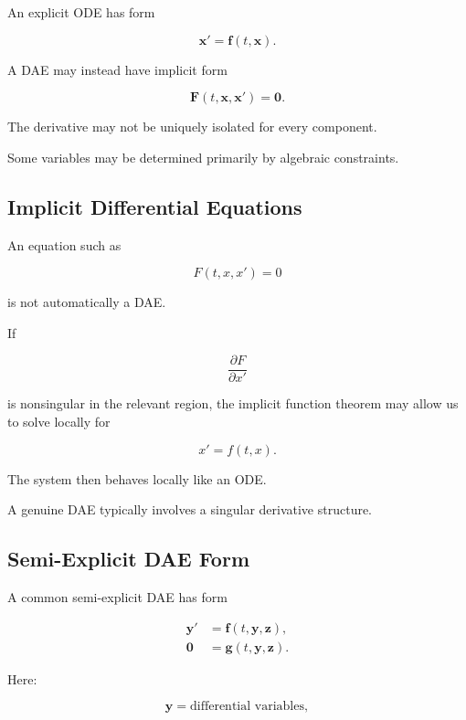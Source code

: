 An explicit ODE has form

\[
\boxed{
\mathbf{x}'
=
\mathbf{f}(t,\mathbf{x}).
}
\]

A DAE may instead have implicit form

\[
\boxed{
\mathbf{F}
(
t,
\mathbf{x},
\mathbf{x}'
)
=
\mathbf{0}.
}
\]

The derivative may not be uniquely isolated for every component.

Some variables may be determined primarily by algebraic constraints.

\subsection{Implicit Differential Equations}
\label{subsec:implicit-differential-equations}

An equation such as

\[
\boxed{
F(t,x,x')=0
}
\]

is not automatically a DAE.

If

\[
\frac{\partial F}{\partial x'}
\]

is nonsingular in the relevant region, the implicit function theorem may
allow us to solve locally for

\[
\boxed{
x'=f(t,x).
}
\]

The system then behaves locally like an ODE.

A genuine DAE typically involves a singular derivative structure.

\subsection{Semi-Explicit DAE Form}
\label{subsec:semi-explicit-dae}

A common semi-explicit DAE has form

\[
\boxed{
\begin{aligned}
\mathbf{y}'
&=
\mathbf{f}
(
t,\mathbf{y},\mathbf{z}
),
\\
\mathbf{0}
&=
\mathbf{g}
(
t,\mathbf{y},\mathbf{z}
).
\end{aligned}
}
\]

Here:

\[
\mathbf{y}
=
\text{differential variables},
\]

